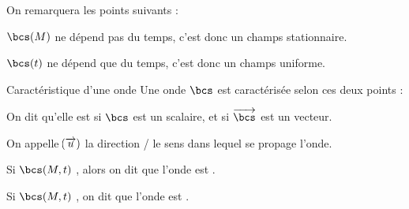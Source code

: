 \documentclass[a4paper,french,bookmarks]{book}
\begin{document}
    On remarquera les points suivants :
    \begin{enumerate}
        \itt $\bcs\p{M}$ ne dépend pas du temps, c'est donc un champs stationnaire.
        
        \itt $\bcs\p{t}$ ne dépend que du temps, c'est donc un champs uniforme.
    \end{enumerate}
    
    \begin{definition}{Caractéristique d'une onde}{}
        Une onde $\bcs$ est caractérisée selon ces deux points :
        \begin{psse}
            \item On dit qu'elle est  si $\bcs$ est un scalaire, et  si $\vec{\bcs}$ est un vecteur.
        
            \item On appelle  $\!\left(\overrightarrow{u}\right)$ la direction / le sens dans lequel se propage l'onde.

            Si $\bcs\p{M,t}$ , alors on dit  que l'onde est .
            
            Si $\bcs\p{M,t}$ , on dit que l'onde est .
        \end{psse}
    \end{definition}
\end{document}
